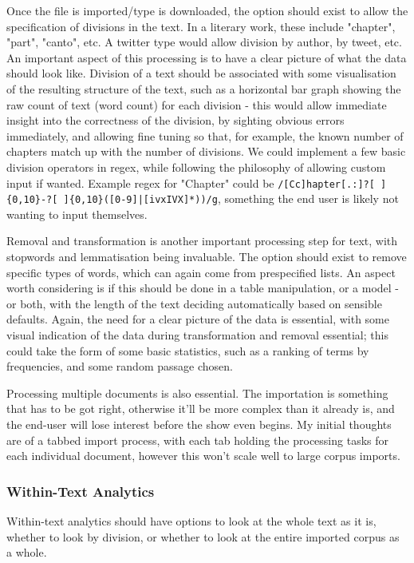 \documentclass[11pt]{article}
\begin{document}
Once the file is imported/type is downloaded, the option should exist to
allow the specification of divisions in the text. In a literary work,
these include "chapter", "part", "canto", etc. A twitter type would
allow division by author, by tweet, etc. An important aspect of this
processing is to have a clear picture of what the data should look like.
Division of a text should be associated with some visualisation of the
resulting structure of the text, such as a horizontal bar graph showing
the raw count of text (word count) for each division - this would allow
immediate insight into the correctness of the division, by sighting
obvious errors immediately, and allowing fine tuning so that, for
example, the known number of chapters match up with the number of
divisions. We could implement a few basic division operators in regex,
while following the philosophy of allowing custom input if wanted.
Example regex for "Chapter" could be
\texttt{/[Cc]hapter[.:]?[   ]\{0,10\}-?[  ]\{0,10\}([0-9]|[ivxIVX]*))/g}, something
the end user is likely not wanting to input themselves.

Removal and transformation is another important processing step for
text, with stopwords and lemmatisation being invaluable. The option
should exist to remove specific types of words, which can again come
from prespecified lists. An aspect worth considering is if this should
be done in a table manipulation, or a model - or both, with the length
of the text deciding automatically based on sensible defaults. Again,
the need for a clear picture of the data is essential, with some visual
indication of the data during transformation and removal essential; this
could take the form of some basic statistics, such as a ranking of terms
by frequencies, and some random passage chosen.

Processing multiple documents is also essential. The importation is
something that has to be got right, otherwise it'll be more complex than
it already is, and the end-user will lose interest before the show even
begins. My initial thoughts are of a tabbed import process, with each
tab holding the processing tasks for each individual document, however
this won't scale well to large corpus imports.

\subsubsection{Within-Text Analytics}
\label{sec:orgd9057cd}
Within-text analytics should have options to look at the whole text as
it is, whether to look by division, or whether to look at the entire
imported corpus as a whole.
\end{document}
